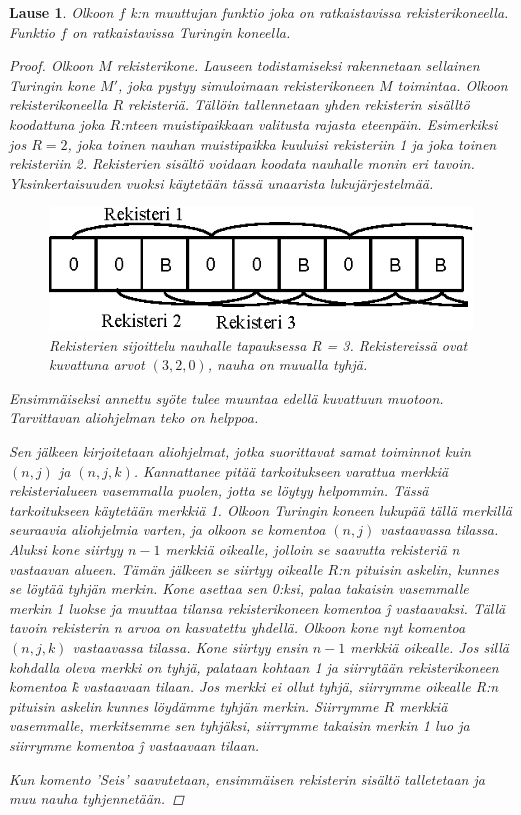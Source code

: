 \documentclass[a4paper, 12pt]{article}
\theoremstyle{definition}
\theoremstyle{plain}
\newtheorem{teor}[mydef]{Lause}
\begin{document}
\begin{teor}
Olkoon $f$ k:n muuttujan funktio joka on ratkaistavissa rekisterikoneella. Funktio $f$ on ratkaistavissa Turingin koneella.
\begin{proof}
Olkoon $M$ rekisterikone. Lauseen todistamiseksi rakennetaan sellainen Turingin kone $M'$, joka pystyy simuloimaan rekisterikoneen $M$ toimintaa. Olkoon rekisterikoneella $R$ rekisteriä. Tällöin tallennetaan yhden rekisterin sisälltö koodattuna joka $R$:nteen muistipaikkaan valitusta rajasta eteenpäin. Esimerkiksi jos $R = 2$, joka toinen nauhan muistipaikka kuuluisi rekisteriin 1 ja joka toinen rekisteriin 2. Rekisterien sisältö voidaan koodata nauhalle monin eri tavoin. Yksinkertaisuuden vuoksi käytetään tässä unaarista lukujärjestelmää.

\begin{figure}[H]
\begin{center}
\includegraphics{graph4b.eps}
\caption{Rekisterien sijoittelu nauhalle tapauksessa R = 3. Rekistereissä ovat kuvattuna arvot $(3, 2, 0)$, nauha on muualla tyhjä.}
\end{center}
\end{figure}

Ensimmäiseksi annettu syöte tulee muuntaa edellä kuvattuun muotoon. Tarvittavan aliohjelman teko on helppoa.

Sen jälkeen kirjoitetaan aliohjelmat, jotka suorittavat samat toiminnot kuin $(n, j)$ ja $(n, j, k)$. Kannattanee pitää tarkoitukseen varattua merkkiä rekisterialueen vasemmalla puolen, jotta se löytyy helpommin. Tässä tarkoitukseen käytetään merkkiä 1. Olkoon Turingin koneen lukupää tällä merkillä seuraavia aliohjelmia varten, ja olkoon se komentoa $(n, j)$ vastaavassa tilassa. Aluksi kone siirtyy $n-1$ merkkiä oikealle, jolloin se saavutta rekisteriä n vastaavan alueen. Tämän jälkeen se siirtyy oikealle $R$:n pituisin askelin, kunnes se löytää tyhjän merkin. Kone asettaa sen 0:ksi, palaa takaisin vasemmalle merkin 1 luokse ja muuttaa tilansa rekisterikoneen komentoa \^j vastaavaksi. Tällä tavoin rekisterin n arvoa on kasvatettu yhdellä. Olkoon kone nyt komentoa $(n, j, k)$ vastaavassa tilassa. Kone siirtyy ensin $n - 1$ merkkiä oikealle. Jos sillä kohdalla oleva merkki on tyhjä, palataan kohtaan 1 ja siirrytään rekisterikoneen komentoa \^k vastaavaan tilaan. Jos merkki ei ollut tyhjä, siirrymme oikealle R:n pituisin askelin kunnes löydämme tyhjän merkin. Siirrymme $R$ merkkiä vasemmalle, merkitsemme sen tyhjäksi, siirrymme takaisin merkin 1 luo ja siirrymme komentoa \^j vastaavaan tilaan.

Kun komento 'Seis' saavutetaan, ensimmäisen rekisterin sisältö talletetaan ja muu nauha tyhjennetään.

\qedhere
\end{proof}
\end{teor}
\end{document}
